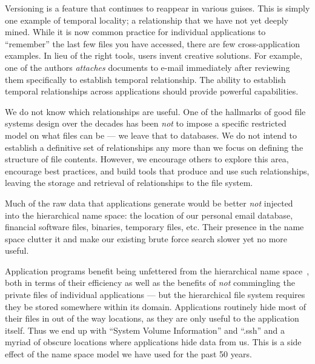 Versioning is a feature that continues to reappear in various guises.
This is simply one example of temporal locality; a
relationship that we have not yet deeply mined.
While it is now common practice for
individual applications to ``remember'' the last few files you have accessed,
there are few cross-application examples.
In lieu of the right tools, users invent creative solutions.
For example, one of the authors \textit{attaches} documents to e-mail
immediately after reviewing them
specifically to establish temporal relationship.
The ability to establish temporal relationships across applications should
provide powerful capabilities.

We do not know which relationships are useful. One of the hallmarks of good file systems design over the decades
has been \textit{not} to impose a specific restricted model on what files can be --- we leave that to databases.
We do not intend to establish a definitive set of relationships any more than we focus on defining
the structure of file contents.
However, we encourage others to explore this area, encourage best practices,
and build tools that produce and use such relationships, leaving the
storage and retrieval of relationships to the file system.


Much of the raw data that applications generate would be better \textit{not} injected into
the hierarchical name space: the location of our personal email database, financial
software files, binaries, temporary files, etc.  Their presence in the name space clutter
it and make our existing brute force search slower yet no more useful.

Application programs benefit being
unfettered from the hierarchical name space~\cite{Ghemawat2003}, both
in terms of their efficiency as well as the benefits of \textit{not} commingling the private files of individual
applications --- but the hierarchical file system requires
they be stored somewhere within its domain.
Applications routinely hide most of their files in out of the way
locations, as they are only useful to the application itself.
Thus we end up with ``System Volume Information'' and ``.ssh'' and a myriad of obscure locations where applications
hide data from us.
This is a side effect of the name space model we have used for the past
50 years.

